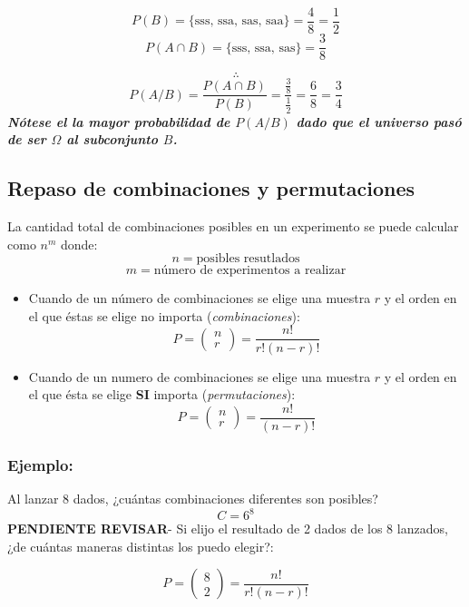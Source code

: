 \documentclass[]{book}
\begin{document}
\[P(B) = \{\text{sss, ssa, sas, saa}\} = \frac{4}{8} = \frac{1}{2}\]
\[P(A\cap B) = \{\text{sss, ssa, sas}\} = \frac{3}{8}\]

\[\therefore\]
\[P(A/B) = \frac {P(A\cap B)}{P(B)} = \frac {\frac {3}{8}}{\frac {1}{2}} = \frac {6}{8} = \frac {3}{4}\]
\textbf{\emph{Nótese el la mayor probabilidad de \(P(A/B)\) dado que el
universo pasó de ser \(\Omega\) al subconjunto \(B\).}}

\subsection{\texorpdfstring{Repaso de \textbf{combinaciones} y
\textbf{permutaciones}}{Repaso de combinaciones y permutaciones}}\label{repaso-de-combinaciones-y-permutaciones}

 La cantidad total de combinaciones posibles en un experimento se puede
calcular como \(n^m\) donde: \[n = \text{posibles resutlados}\]
\[m = \text{número de experimentos a realizar}\]

\begin{itemize}
\item
  Cuando de un número de combinaciones se elige una muestra \(r\) y el
  orden en el que éstas se elige no importa (\emph{combinaciones}):
  \[P = \left( \begin{array}{c} n \\ r \end{array} \right) = \frac {n!}{r!(n-r)!}\]
\item
  Cuando de un numero de combinaciones se elige una muestra \(r\) y el
  orden en el que ésta se elige \textbf{SI} importa
  (\emph{permutaciones}):
  \[P = \left( \begin{array}{c} n \\ r \end{array} \right) = \frac {n!}{(n-r)!}\]
\end{itemize}

\subsubsection{Ejemplo:}\label{ejemplo}

Al lanzar 8 dados, ¿cuántas combinaciones diferentes son posibles?
\[C = 6^8\] \textbf{PENDIENTE REVISAR}- Si elijo el resultado de 2 dados
de los 8 lanzados, ¿de cuántas maneras distintas los puedo elegir?:

\[P = \left( \begin{array}{c} 8 \\ 2 \end{array} \right) = \frac {n!}{r!(n-r)!}\]
\end{document}

